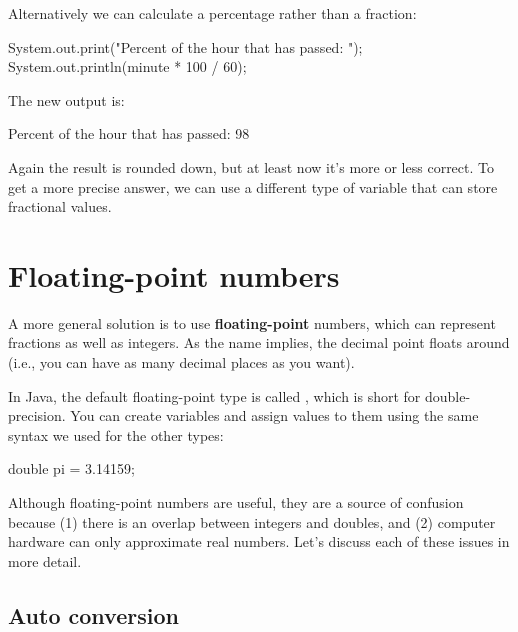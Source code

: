Alternatively we can calculate a percentage rather than a fraction:

\begin{code}
    System.out.print("Percent of the hour that has passed: ");
    System.out.println(minute * 100 / 60);
\end{code}

The new output is:

\begin{stdout}
Percent of the hour that has passed: 98
\end{stdout}

Again the result is rounded down, but at least now it's more or less correct.
To get a more precise answer, we can use a different type of variable that can store fractional values.


\section{Floating-point numbers}


A more general solution is to use {\bf floating-point} numbers, which can represent fractions as well as integers.
As the name implies, the decimal point floats around (i.e., you can have as many decimal places as you want).

In Java, the default floating-point type is called , which is short for double-precision.
You can create  variables and assign values to them using the same syntax we used for the other types:

\begin{code}
    double pi = 3.14159;
\end{code}

Although floating-point numbers are useful, they are a source of confusion because (1) there is an overlap between integers and doubles, and (2) computer hardware can only approximate real numbers.
Let's discuss each of these issues in more detail.

\subsection{Auto conversion}


